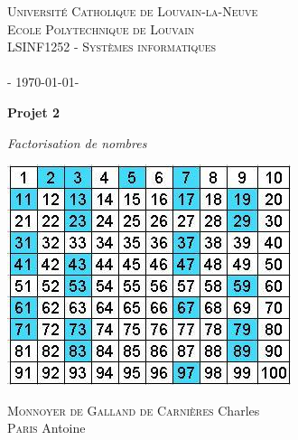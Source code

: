 \begin{titlepage}

\begin{center}
\textsc{\LARGE  Université Catholique de Louvain-la-Neuve}\\[0.5cm]

\textsc{\large Ecole Polytechnique de Louvain\\ 
LSINF1252 - Systèmes informatiques}\\[1cm]

\textsc{\Large   \\  \vspace{0.8cm}- \today -}\\[0.5cm]

\vspace{0.5cm}

{ \huge \bfseries Projet 2 \\
 [0.4cm]}
 
{\Large \textit{Factorisation de nombres}}

\vspace{1.5cm}

\includegraphics[scale=0.8]{img/couv.jpg}
 
\vspace{1.5cm}
 
\textsc {Monnoyer de Galland de Carnières} Charles\\
\textsc {Paris} Antoine

\end{center}
\end{titlepage}